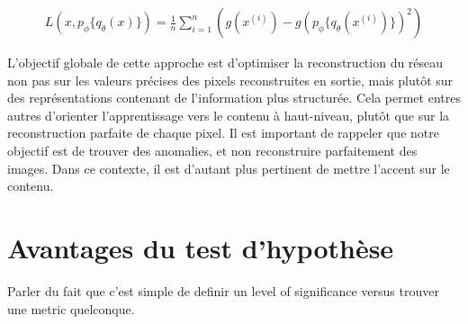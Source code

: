 \begin{gather} \label{eq:perceptual_loss}
L(x, p_\phi\{q_\theta(x)\}) = \frac{1}{n} \sum_{i=1}^{n} (g(x^{(i)}) - g(p_\phi\{q_\theta(x^{(i)})\})^2)
\end{gather}

L'objectif globale de cette approche est d'optimiser la reconstruction du réseau non pas sur les valeurs précises des pixels reconstruites en sortie, mais plutôt sur des représentations contenant de l'information plus structurée. Cela permet entres autres d'orienter l'apprentissage vers le contenu à haut-niveau, plutôt que sur la reconstruction parfaite de chaque pixel. Il est important de rappeler que notre objectif est de trouver des anomalies, et non reconstruire parfaitement des images. Dans ce contexte, il est d'autant plus pertinent de mettre l'accent sur le contenu.


\section{Avantages du test d'hypothèse}

Parler du fait que c'est simple de definir un level of significance versus trouver une metric quelconque.